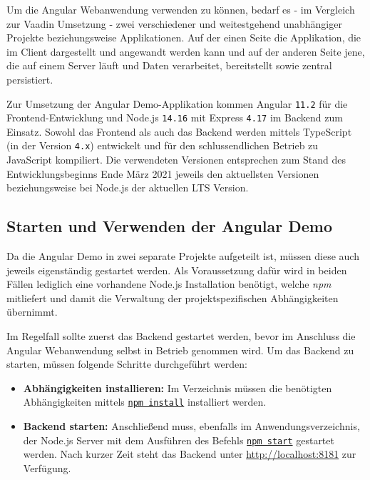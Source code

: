 \documentclass[a4paper,12pt,twoside]{scrreprt}
\begin{document}
Um die Angular Webanwendung verwenden zu können, bedarf es - im Vergleich zur Vaadin Umsetzung - zwei verschiedener und weitestgehend unabhängiger Projekte beziehungsweise Applikationen. Auf der einen Seite die Applikation, die im Client dargestellt und angewandt werden kann und auf der anderen Seite jene, die auf einem Server läuft und Daten verarbeitet, bereitstellt sowie zentral persistiert.

\medskip

Zur Umsetzung der Angular Demo-Applikation kommen Angular \texttt{11.2} für die Frontend-Entwicklung und Node.js \texttt{14.16} mit Express \texttt{4.17} im Backend zum Einsatz. Sowohl das Frontend als auch das Backend werden mittels TypeScript (in der Version \texttt{4.x}) entwickelt und für den schlussendlichen Betrieb zu JavaScript kompiliert. Die verwendeten Versionen entsprechen zum Stand des Entwicklungsbeginns Ende März 2021 jeweils den aktuellsten Versionen beziehungsweise bei Node.js der aktuellen \ac{LTS} Version.

\subsection{Starten und Verwenden der Angular Demo}
\label{sub-sec:starten-verwenden-angular}
Da die Angular Demo in zwei separate Projekte aufgeteilt ist, müssen diese auch jeweils eigenständig gestartet werden. Als Voraussetzung dafür wird in beiden Fällen lediglich eine vorhandene Node.js Installation benötigt, welche \textit{npm} mitliefert und damit die Verwaltung der projektspezifischen Abhängigkeiten übernimmt.

\medskip

Im Regelfall sollte zuerst das Backend gestartet werden, bevor im Anschluss die Angular Webanwendung selbst in Betrieb genommen wird. Um das Backend zu starten, müssen folgende Schritte durchgeführt werden:

\clearpage

\begin{itemize}
    \item \textbf{Abhängigkeiten installieren:} Im Verzeichnis  müssen die benötigten Abhängigkeiten mittels \underline{\texttt{npm install}} installiert werden.
    \item \textbf{Backend starten:} Anschließend muss, ebenfalls im Anwendungsverzeichnis, der Node.js Server mit dem Ausführen des Befehls \underline{\texttt{npm start}} gestartet werden. Nach kurzer Zeit steht das Backend unter \url{http://localhost:8181} zur Verfügung.
\end{itemize}
\end{document}
